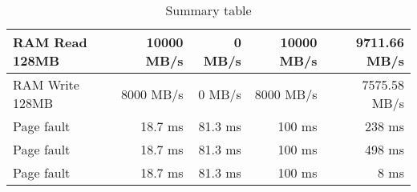 \begin{table}[h]
\begin{center}
\begin{tabular}{| l | r | r | r | r |}
RAM Read 128MB 	& 10000 MB/s	& 0 MB/s	& 10000 MB/s	& 9711.66 MB/s \\
\hline
RAM Write 128MB & 8000 MB/s	& 0 MB/s	& 8000 MB/s	& 7575.58 MB/s \\
\hline \hline

Page fault	& 18.7 ms	& 81.3 ms 	& 100 ms	& 238 ms\\ \hline
Page fault	& 18.7 ms	& 81.3 ms 	& 100 ms	& 498 ms\\ \hline
Page fault	& 18.7 ms	& 81.3 ms 	& 100 ms	& 8 ms\\ \hline \hline














\end{tabular}
\end{center}






\caption{Summary table}

\end{table}

